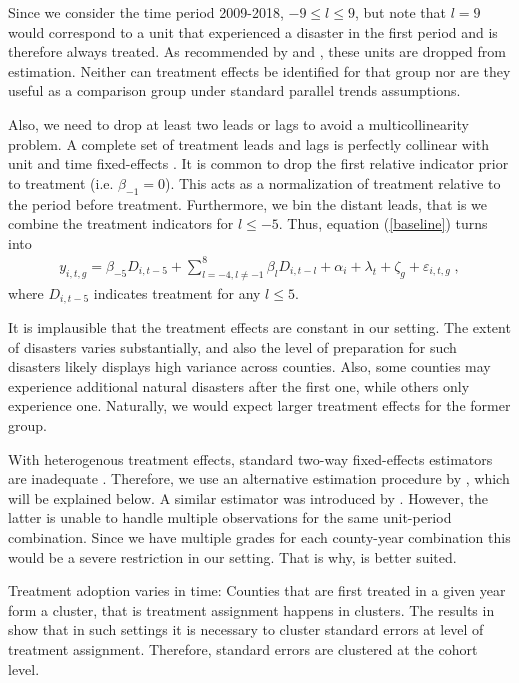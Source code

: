 Since we consider the time period 2009-2018, $-9 \leq l \leq 9$, but note that $l = 9$ would correspond to a unit that experienced a disaster in the first period and is therefore always treated. As recommended by \cite{Sun_2021} and \cite{Callaway_2021}, these units are dropped from estimation. Neither can treatment effects be identified for that group nor are they useful as a comparison group under standard parallel trends assumptions.

Also, we need to drop at least two leads or lags to avoid a multicollinearity problem. A complete set of treatment leads and lags is perfectly collinear with unit and time fixed-effects \citep[for an extensive discussion of this issue see][section 3.2]{Borusyak_2021}. It is common to drop the first relative indicator prior to treatment (i.e. $\beta_{-1} = 0$). This acts as a normalization of treatment relative to the period before treatment. Furthermore, we bin the distant leads, that is we combine the treatment indicators for $l \leq -5$. Thus, equation (\ref{baseline}) turns into
\begin{align} \label{baselineBinned}
	y_{i, t, g} = \beta_{-5}  D_{i, t-5} + \sum_{l = -4, l \neq -1}^{8} \beta_l D_{i, t-l} + \alpha_i + \lambda_t + \zeta_g + \varepsilon_{i, t, g} \;,
\end{align}
where $D_{i, t-5}$ indicates treatment for any $l \leq 5$.

It is implausible that the treatment effects are constant in our setting. The extent of disasters varies substantially, and also the level of preparation for such disasters likely displays high variance across counties. Also, some counties may experience additional natural disasters after the first one, while others only experience one. Naturally, we would expect larger treatment effects for the former group.

With heterogenous treatment effects, standard two-way fixed-effects estimators are inadequate \citep{deChaisemartin_2020, deChaisemartin_2022, Sun_2021}. Therefore, we use an alternative estimation procedure by \cite{Sun_2021}, which will be explained below. A similar estimator was introduced by \cite{Callaway_2021}. However, the latter is unable to handle multiple observations for the same unit-period combination. Since we have multiple grades for each county-year combination this would be a severe restriction in our setting. That is why, \cite{Sun_2021} is better suited.

Treatment adoption varies in time: Counties that are first treated in a given year form a cluster, that is treatment assignment happens in clusters. The results in \cite{Abadie_2017} show that in such settings it is necessary to cluster standard errors at level of treatment assignment. Therefore, standard errors are clustered at the cohort level.



